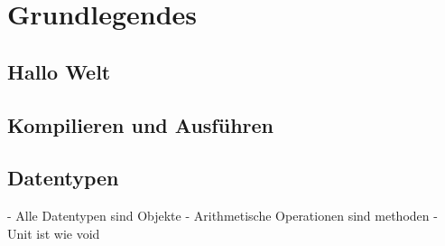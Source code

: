 \chapter{Grundlegendes}

\section{Hallo Welt}

\section{Kompilieren und Ausführen}

\section{Datentypen}

- Alle Datentypen sind Objekte
- Arithmetische Operationen sind methoden
- Unit ist wie void
